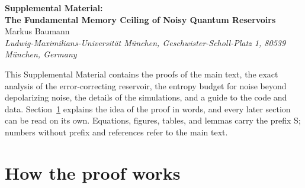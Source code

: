 \documentclass[aps,prl,twocolumn,superscriptaddress,floatfix]{revtex4-2}
\theoremstyle{plain}
\begin{document}
\nocite{vonNeumann1956,Nelson2026,Xiong2025,Dao2026}


\clearpage
\onecolumngrid
\setcounter{equation}{0}
\setcounter{figure}{0}
\setcounter{table}{0}
\setcounter{section}{0}
\setcounter{lemma}{0}
\setcounter{page}{1}
\renewcommand{\theequation}{S\arabic{equation}}
\renewcommand{\thefigure}{S\arabic{figure}}
\renewcommand{\thetable}{S\arabic{table}}
\renewcommand{\thelemma}{S\arabic{lemma}}
\renewcommand{\thepage}{S\arabic{page}}
\renewcommand{\theHfigure}{S\arabic{figure}}
\renewcommand{\theHtable}{S\arabic{table}}
\setcounter{secnumdepth}{3}

\begin{center}
{\large\bfseries Supplemental Material:\\[3pt] The Fundamental Memory Ceiling of Noisy Quantum Reservoirs}\\[10pt]
Markus Baumann\\[3pt]
{\small\itshape Ludwig-Maximilians-Universit\"at M\"unchen, Geschwister-Scholl-Platz 1, 80539 M\"unchen, Germany}
\end{center}

This Supplemental Material contains the proofs of the main text, the exact analysis of the error-correcting reservoir, the entropy budget for noise beyond depolarizing noise, the details of the simulations, and a guide to the code and data. Section~\ref{sm:overview} explains the idea of the proof in words, and every later section can be read on its own. Equations, figures, tables, and lemmas carry the prefix S; numbers without prefix and references refer to the main text.

\let\addcontentsline\SMaddcontentsline
\tableofcontents
\vspace{8pt}

\section{How the proof works}
\label{sm:overview}
\end{document}
